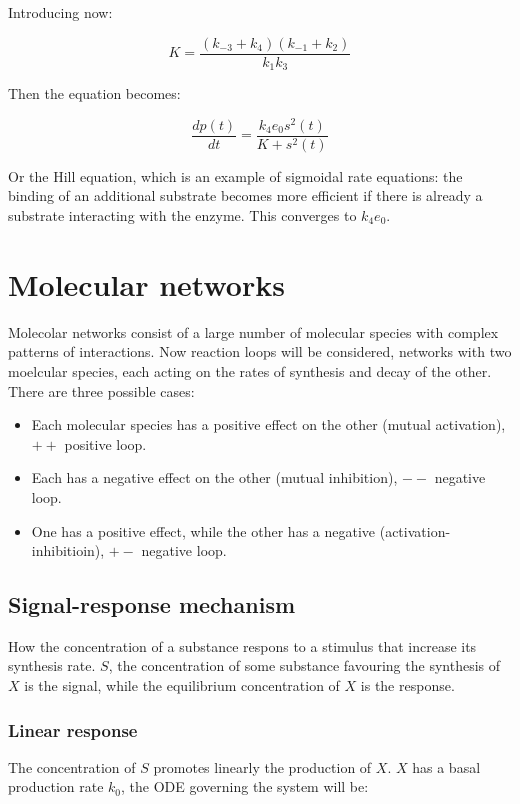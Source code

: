     Introducing now:

    $$K = \frac{(k_{-3} + k_4)(k_{-1} + k_2)}{k_1k_3}$$

    Then the equation becomes:

    $$\frac{dp(t)}{dt} = \frac{k_4e_0s^2(t)}{K + s^2(t)}$$

    Or the Hill equation, which is an example of sigmoidal rate equations: the binding of an additional substrate becomes more efficient if there is already a substrate interacting with the enzyme.
    This converges to $k_4e_0$.

\section{Molecular networks}
Molecolar networks consist of a large number of molecular species with complex patterns of interactions.
Now reaction loops will be considered, networks with two moelcular species, each acting on the rates of synthesis and decay of the other.
There are three possible cases:

\begin{multicols}{2}
  \begin{itemize}
    \item Each molecular species has a positive effect on the other (mutual activation), $++$ positive loop.
    \item Each has a negative effect on the other (mutual inhibition), $--$ negative loop.
    \item One has a positive effect, while the other has a negative (activation-inhibitioin), $+-$ negative loop.
  \end{itemize}
\end{multicols}

  \subsection{Signal-response mechanism}
  How the concentration of a substance respons to a stimulus that increase its synthesis rate.
  $S$, the concentration of some substance favouring the synthesis of $X$ is the signal, while the equilibrium concentration of $X$ is the response.

    \subsubsection{Linear response}
    The concentration of $S$ promotes linearly the production of $X$.
    $X$ has a basal production rate $k_0$, the ODE governing the system will be:

